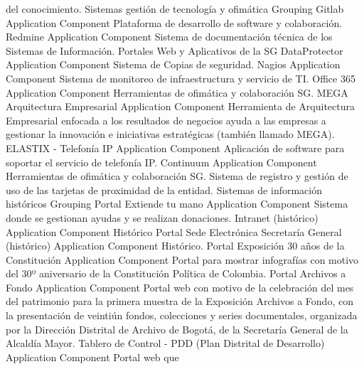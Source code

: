 \documentclass[
	a4paper, %
	12pt, %
]{include/CSSullivanBusinessReport}
\begin{document}
del conocimiento. \textbar{} \textbar{} Sistemas gestión de tecnología y
ofimática \textbar{} Grouping \textbar{} \textbar{} \textbar{} Gitlab
\textbar{} Application Component \textbar{} Plataforma de desarrollo de
software y colaboración. \textbar{} \textbar{} Redmine \textbar{}
Application Component \textbar{} Sistema de documentación técnica de los
Sistemas de Información. Portales Web y Aplicativos de la SG \textbar{}
\textbar{} DataProtector \textbar{} Application Component \textbar{}
Sistema de Copias de seguridad. \textbar{} \textbar{} Nagios \textbar{}
Application Component \textbar{} Sistema de monitoreo de infraestructura
y servicio de TI. \textbar{} \textbar{} Office 365 \textbar{}
Application Component \textbar{} Herramientas de ofimática y
colaboración SG. \textbar{} \textbar{} MEGA Arquitectura Empresarial
\textbar{} Application Component \textbar{} Herramienta de Arquitectura
Empresarial enfocada a los resultados de negocios ayuda a las empresas a
gestionar la innovación e iniciativas estratégicas (también llamado
MEGA). \textbar{} \textbar{} ELASTIX - Telefonía IP \textbar{}
Application Component \textbar{} Aplicación de software para soportar el
servicio de telefonía IP. \textbar{} \textbar{} Continuum \textbar{}
Application Component \textbar{} Herramientas de ofimática y
colaboración SG. Sistema de registro y gestión de uso de las tarjetas de
proximidad de la entidad. \textbar{} \textbar{} Sistemas de información
históricos \textbar{} Grouping \textbar{} \textbar{} \textbar{} Portal
Extiende tu mano \textbar{} Application Component \textbar{} Sistema
donde se gestionan ayudas y se realizan donaciones. \textbar{}
\textbar{} Intranet (histórico) \textbar{} Application Component
\textbar{} Histórico \textbar{} \textbar{} Portal Sede Electrónica
Secretaría General (histórico) \textbar{} Application Component
\textbar{} Histórico. \textbar{} \textbar{} Portal Exposición 30 años de
la Constitución \textbar{} Application Component \textbar{} Portal para
mostrar infografías con motivo del 30º aniversario de la Constitución
Política de Colombia. \textbar{} \textbar{} Portal Archivos a Fondo
\textbar{} Application Component \textbar{} Portal web con motivo de la
celebración del mes del patrimonio para la primera muestra de la
Exposición Archivos a Fondo, con la presentación de veintiún fondos,
colecciones y series documentales, organizada por la Dirección Distrital
de Archivo de Bogotá, de la Secretaría General de la Alcaldía Mayor.
\textbar{} \textbar{} Tablero de Control - PDD (Plan Distrital de
Desarrollo) \textbar{} Application Component \textbar{} Portal web que
\end{document}
